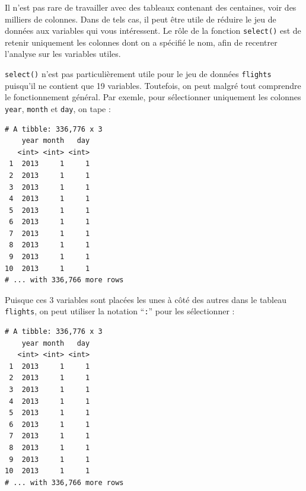 \documentclass[
  a4paper,
]{article}
\newenvironment{Shaded}{\begin{snugshade}}{\end{snugshade}}
\newcommand{\CommentTok}[1]{\textcolor[rgb]{0.54,0.53,0.53}{#1}}
\newcommand{\KeywordTok}[1]{\textcolor[rgb]{0.12,0.11,0.11}{\textbf{#1}}}
\newcommand{\NormalTok}[1]{\textcolor[rgb]{0.12,0.11,0.11}{#1}}
\newcommand{\OperatorTok}[1]{\textcolor[rgb]{0.12,0.11,0.11}{#1}}
\newcommand{\StringTok}[1]{\textcolor[rgb]{0.75,0.01,0.01}{#1}}
\begin{document}
Il n'est pas rare de travailler avec des tableaux contenant des centaines, voir des milliers de colonnes. Dans de tels cas, il peut être utile de réduire le jeu de données aux variables qui vous intéressent. Le rôle de la fonction \texttt{select()} est de retenir uniquement les colonnes dont on a spécifié le nom, afin de recentrer l'analyse sur les variables utiles.

\texttt{select()} n'est pas particulièrement utile pour le jeu de données \texttt{flights} puisqu'il ne contient que 19 variables. Toutefois, on peut malgré tout comprendre le fonctionnement général. Par exemle, pour sélectionner uniquement les colonnes \texttt{year}, \texttt{month} et \texttt{day}, on tape :

\begin{Shaded}
\end{Shaded}

\begin{verbatim}
# A tibble: 336,776 x 3
    year month   day
   <int> <int> <int>
 1  2013     1     1
 2  2013     1     1
 3  2013     1     1
 4  2013     1     1
 5  2013     1     1
 6  2013     1     1
 7  2013     1     1
 8  2013     1     1
 9  2013     1     1
10  2013     1     1
# ... with 336,766 more rows
\end{verbatim}

Puisque ces 3 variables sont placées les unes à côté des autres dans le tableau \texttt{flights}, on peut utiliser la notation ``\texttt{:}'' pour les sélectionner :

\begin{Shaded}
\end{Shaded}

\begin{verbatim}
# A tibble: 336,776 x 3
    year month   day
   <int> <int> <int>
 1  2013     1     1
 2  2013     1     1
 3  2013     1     1
 4  2013     1     1
 5  2013     1     1
 6  2013     1     1
 7  2013     1     1
 8  2013     1     1
 9  2013     1     1
10  2013     1     1
# ... with 336,766 more rows
\end{verbatim}
\end{document}

